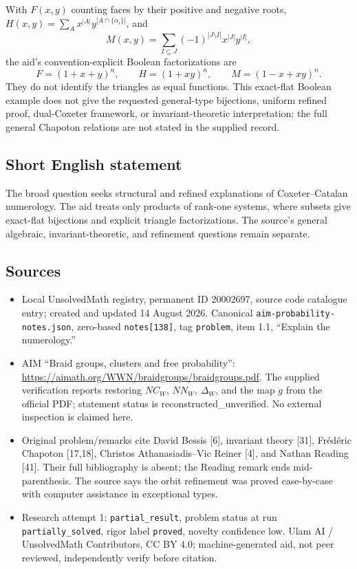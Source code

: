 \documentclass[11pt]{article}
\begin{document}
With $F(x,y)$ counting faces by their positive and negative roots, $H(x,y)=\sum_Ax^{|A|}y^{|A\cap\{\alpha_i\}|}$, and
\[
 M(x,y)=\sum_{I\subseteq J}(-1)^{|J\setminus I|}x^{|J|}y^{|I|},
\]
the aid's convention-explicit Boolean factorizations are
\[
 F=(1+x+y)^n,\qquad H=(1+xy)^n,\qquad M=(1-x+xy)^n.
\]
They do not identify the triangles as equal functions. This exact-flat Boolean example does not give the requested general-type bijections, uniform refined proof, dual-Coxeter framework, or invariant-theoretic interpretation; the full general Chapoton relations are not stated in the supplied record.
\subsection{Short English statement}
The broad question seeks structural and refined explanations of Coxeter--Catalan numerology. The aid treats only products of rank-one systems, where subsets give exact-flat bijections and explicit triangle factorizations. The source's general algebraic, invariant-theoretic, and refinement questions remain separate.
\subsection{Sources}
\begin{itemize}
\item Local UnsolvedMath registry, permanent ID 20002697, source code catalogue entry; created and updated 14 August 2026. Canonical \texttt{aim-probability-notes.json}, zero-based \texttt{notes[138]}, tag \texttt{problem}, item 1.1, ``Explain the numerology.''
\item AIM ``Braid groups, clusters and free probability'': \url{https://aimath.org/WWN/braidgroups/braidgroups.pdf}. The supplied verification reports restoring $NC_W$, $NN_W$, $\Delta_W$, and the map $g$ from the official PDF; statement status is reconstructed\_unverified. No external inspection is claimed here.
\item Original problem/remarks cite David Bessis [6], invariant theory [31], Fr\'ed\'eric Chapoton [17,18], Christos Athanasiadis--Vic Reiner [4], and Nathan Reading [41]. Their full bibliography is absent; the Reading remark ends mid-parenthesis. The source says the orbit refinement was proved case-by-case with computer assistance in exceptional types.
\item Research attempt 1: \texttt{partial\_result}, problem status at run \texttt{partially\_solved}, rigor label \texttt{proved}, novelty confidence low. Ulam AI / UnsolvedMath Contributors, CC BY 4.0; machine-generated aid, not peer reviewed, independently verify before citation.
\end{itemize}
\end{document}
